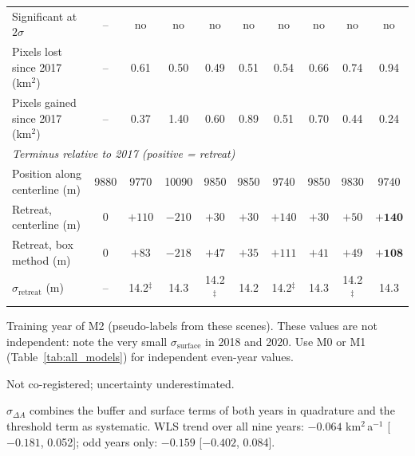 \documentclass[10pt]{article}
\newcommand{\kmsq}{km$^2$}
\newcommand{\tr}{$^\dagger$}   %
\newcommand{\nc}{$^\ddagger$}  %
\begin{document}
\begin{table}
\begin{threeparttable}
\begin{tabular}{l ccccccccc}
Significant at $2\sigma$           & -- & no & no & no & no & no & no & no & no \\
Pixels lost since 2017 (\kmsq)     & -- & 0.61 & 0.50 & 0.49 & 0.51 & 0.54 & 0.66 & 0.74 & 0.94 \\
Pixels gained since 2017 (\kmsq)   & -- & 0.37 & 1.40 & 0.60 & 0.89 & 0.51 & 0.70 & 0.44 & 0.24 \\
\midrule
\multicolumn{10}{l}{\textit{Terminus relative to 2017 (positive = retreat)}} \\
Position along centerline (m)      & 9880 & 9770 & 10090 & 9850 & 9850 & 9740 & 9850 & 9830 & 9740 \\
Retreat, centerline (m)            & 0 & $+110$ & $-210$ & $+30$ & $+30$ & $+140$ & $+30$ & $+50$ & $\mathbf{+140}$ \\
Retreat, box method (m)            & 0 & $+83$ & $-218$ & $+47$ & $+35$ & $+111$ & $+41$ & $+49$ & $\mathbf{+108}$ \\
$\sigma_\mathrm{retreat}$ (m)      & -- & 14.2\nc & 14.3 & 14.2\nc & 14.2 & 14.2\nc & 14.3 & 14.2\nc & 14.3 \\
\bottomrule
\end{tabular}
\begin{tablenotes}\footnotesize
\item[\tr] Training year of M2 (pseudo-labels from these scenes). These values are not independent: note
the very small $\sigma_\mathrm{surface}$ in 2018 and 2020. Use M0 or M1 (Table~\ref{tab:all_models}) for
independent even-year values.
\item[\nc] Not co-registered; uncertainty underestimated.
\item $\sigma_{\Delta A}$ combines the buffer and surface terms of both years in quadrature and the
threshold term as systematic. WLS trend over all nine years: $-0.064$ \kmsq\,a$^{-1}$ [$-0.181$, 0.052];
odd years only: $-0.159$ [$-0.402$, 0.084].
\end{tablenotes}
\end{threeparttable}
\end{table}
\end{document}
